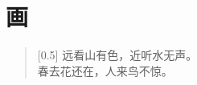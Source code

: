 \documentclass[12pt,UTF-8,openany]{ctexbook}
\begin{document}
\clearpage

\begin{center}
    
    
    
\end{center}


\hanzibox{}\hanzibox{}\hanzibox{}\hanzibox{}\hspace{1em}\hanzibox{}\hanzibox{}\hanzibox{}\hanzibox{}

\hanzibox{}\hanzibox{}\hanzibox{}\hanzibox{}\hspace{1em}\hanzibox{}\hanzibox{}\hanzibox{}\hanzibox{}

\hanzibox{}\hanzibox{}\hanzibox{}\hanzibox{}\hspace{1em}\hanzibox{}\hanzibox{}\hanzibox{}\hanzibox{}






\chapter{画}

\begin{large}
    
    \begin{verse}[0.5\linewidth]
        远看山有色，近听水无声。 \\
        春去花还在，人来鸟不惊。
    \end{verse}
    
\end{large}


\clearpage

\begin{center}
    
\end{center}


\hanzibox{}\hanzibox{}\hanzibox{}\hanzibox{}\hspace{1em}\hanzibox{}\hanzibox{}\hanzibox{}\hanzibox{}

\hanzibox{}\hanzibox{}\hanzibox{}\hanzibox{}\hspace{1em}\hanzibox{}\hanzibox{}\hanzibox{}\hanzibox{}
\end{document}
